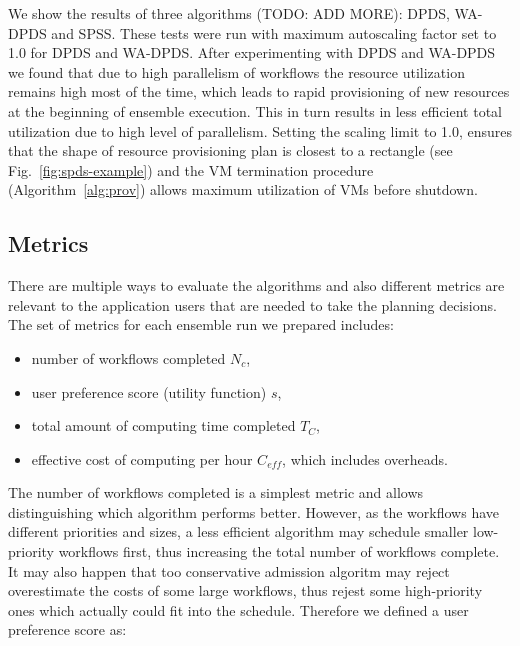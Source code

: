 \documentclass{sig-alternate}
\begin{document}
We show the results of three algorithms (TODO: ADD MORE): DPDS, WA-DPDS and
SPSS. These tests were run with maximum autoscaling factor set to 1.0 for
DPDS and WA-DPDS. After experimenting with DPDS and WA-DPDS we found that due to
high parallelism of workflows the resource utilization remains high most of the time, 
which leads to rapid provisioning of new resources at the beginning of ensemble
execution. This in turn results in less efficient total utilization due to high
level of parallelism. Setting the scaling limit to 1.0, ensures that the shape
of resource provisioning plan is closest to a rectangle (see
Fig.~\ref{fig:spds-example}) and the VM termination procedure
(Algorithm~\ref{alg:prov}) allows maximum utilization of VMs before shutdown.




\subsection{Metrics}




There are multiple ways to evaluate the algorithms and also different metrics
are relevant to the application users that are needed to take the planning
decisions. The set of metrics for each ensemble run we prepared includes:
\begin{itemize}
  \item number of workflows completed $N_c$,
  \item user preference score (utility function) $s$,
  \item total amount of computing time completed $T_C$,
  \item effective cost of computing per hour $C_{eff}$, which includes
  overheads.
\end{itemize}


The number of workflows completed is a simplest metric and allows distinguishing
which algorithm performs better. However, as the workflows have
different priorities and sizes, a less efficient algorithm may schedule smaller
low-priority workflows first, thus increasing the total number of workflows
complete. It may also happen that too conservative admission algoritm may reject
overestimate the costs of some large workflows, thus rejest some high-priority
ones which actually could fit into the schedule. Therefore we defined a user
preference score as:

\end{document}
